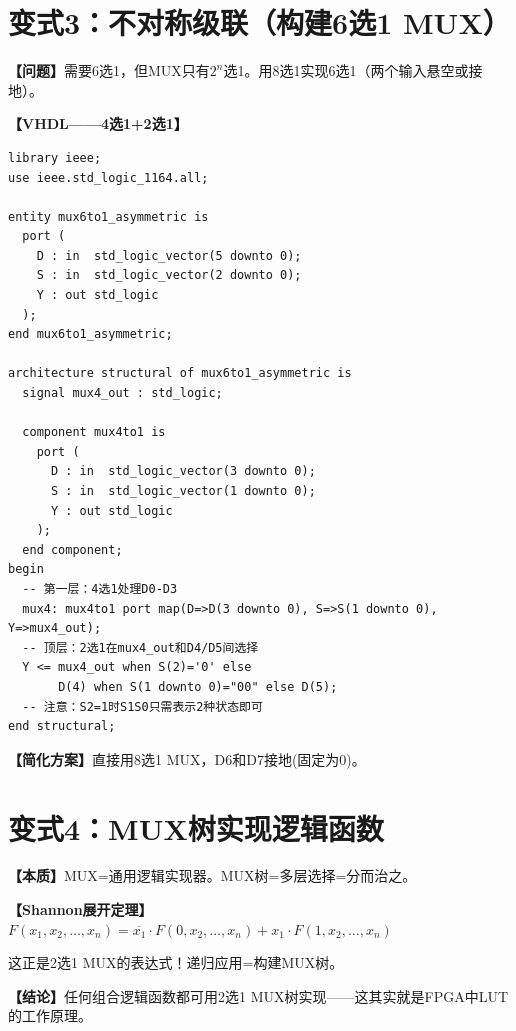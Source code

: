 \section{变式3：不对称级联（构建6选1 MUX）}

\begin{detailbox}[完整教学]
\textbf{【问题】}需要6选1，但MUX只有$2^n$选1。用8选1实现6选1（两个输入悬空或接地）。

\textbf{【VHDL——4选1+2选1】}
\begin{lstlisting}[caption={6选1 MUX（4选1+2选1级联）}]
library ieee;
use ieee.std_logic_1164.all;

entity mux6to1_asymmetric is
  port (
    D : in  std_logic_vector(5 downto 0);
    S : in  std_logic_vector(2 downto 0);
    Y : out std_logic
  );
end mux6to1_asymmetric;

architecture structural of mux6to1_asymmetric is
  signal mux4_out : std_logic;

  component mux4to1 is
    port (
      D : in  std_logic_vector(3 downto 0);
      S : in  std_logic_vector(1 downto 0);
      Y : out std_logic
    );
  end component;
begin
  -- 第一层：4选1处理D0-D3
  mux4: mux4to1 port map(D=>D(3 downto 0), S=>S(1 downto 0), Y=>mux4_out);
  -- 顶层：2选1在mux4_out和D4/D5间选择
  Y <= mux4_out when S(2)='0' else
       D(4) when S(1 downto 0)="00" else D(5);
  -- 注意：S2=1时S1S0只需表示2种状态即可
end structural;
\end{lstlisting}

\textbf{【简化方案】}直接用8选1 MUX，D6和D7接地(固定为0)。
\end{detailbox}


\section{变式4：MUX树实现逻辑函数}

\begin{detailbox}[完整教学]
\textbf{【本质】}MUX=通用逻辑实现器。MUX树=多层选择=分而治之。

\textbf{【Shannon展开定理】}$F(x_1,x_2,\dots,x_n)= \overline{x_1}\cdot F(0,x_2,\dots,x_n) + x_1\cdot F(1,x_2,\dots,x_n)$

这正是2选1 MUX的表达式！递归应用=构建MUX树。

\textbf{【结论】}任何组合逻辑函数都可用2选1 MUX树实现——这其实就是FPGA中LUT的工作原理。
\end{detailbox}
